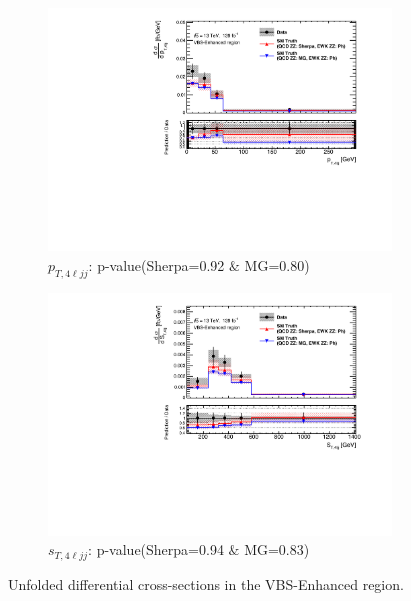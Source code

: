 \begin{figure}[!htb]
\begin{subfigure}{.48\textwidth}
        \includegraphics[width=.98\linewidth]{figures/Results/CrossSection_VBSEnhanced/xs_ptzzjj_SR.pdf}
        \caption{ \footnotesize{$p_{T,4\ell jj}$: p-value(Sherpa=0.92 $\&$ MG=0.80)}}
    \end{subfigure}
    \begin{subfigure}{.48\textwidth}
        \centering
        \includegraphics[width=.98\linewidth]{figures/Results/CrossSection_VBSEnhanced/xs_stzzjj_SR.pdf}
        \caption{ \footnotesize{$s_{T, 4\ell jj}$: p-value(Sherpa=0.94 $\&$ MG=0.83)}}
    \end{subfigure}
    \caption{Unfolded differential cross-sections in the VBS-Enhanced region.} \label{fig:unfolded_xs_VBS_Enhanced_a}
\end{figure}

